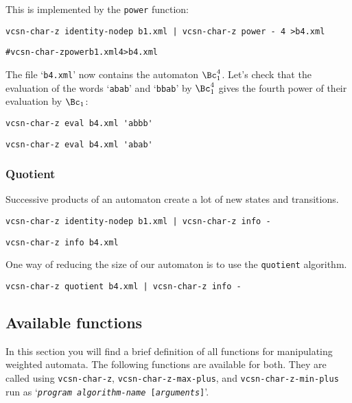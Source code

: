 \documentclass[a4paper]{report}
\newcommand{\Index}[1]{\index{#1}#1}
\newenvironment{shell}
{\begin{alltt}}
{\end{alltt}}
\newcommand\file[1]{`\texttt{#1}'}
\newcommand\command[1]{\texttt{#1}}
\newcommand\var[1]{{\ttfamily\itshape #1}}
\newcommand\code[1]{\texttt{#1}}
\newcommand\samp[1]{`\texttt{#1}'}
\newcommand{\taffn}[1]{\code{#1}}
\begin{document}
\noindent
This is implemented by the \Index{\taffn{power}} function:

\begin{verbatim}
vcsn-char-z identity-nodep b1.xml | vcsn-char-z power - 4 >b4.xml
\end{verbatim}
\begin{shell}
# vcsn-char-z power b1.xml 4 > b4.xml
\end{shell}

\noindent
The file \file{b4.xml} now contains the automaton $\Bc_1^4$.  Let's
check that the evaluation of the words \samp{abab} and \samp{bbab} by
$\Bc_1^4$ gives the fourth power of their evaluation by $\Bc_1$:

\begin{verbatim}
vcsn-char-z eval b4.xml 'abbb'
\end{verbatim}
\begin{verbatim}
vcsn-char-z eval b4.xml 'abab'
\end{verbatim}

\subsubsection{Quotient}

Successive products of an automaton create a lot of new states and
transitions.

\begin{verbatim}
vcsn-char-z identity-nodep b1.xml | vcsn-char-z info -
\end{verbatim}
\begin{verbatim}
vcsn-char-z info b4.xml
\end{verbatim}

One way of reducing the size of our automaton is to use the
\Index{\taffn{quotient}} algorithm.

\begin{verbatim}
vcsn-char-z quotient b4.xml | vcsn-char-z info -
\end{verbatim}


\subsection{Available functions}

In this section you will find a brief definition of all functions for
manipulating weighted automata. The following functions are available
for both.  They are called using \command{vcsn-char-z},
\command{vcsn-char-z-max-plus}, and \command{vcsn-char-z-min-plus} run as
\samp{\var{program} \var{algorithm-name} [\var{arguments}]}.
\end{document}
